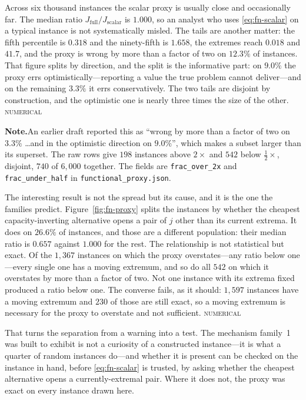 \documentclass[conference]{IEEEtran}
\theoremstyle{definition}
\newcommand{\NUM}{\textsc{numerical}}
\newif\ifshownotes\shownotestrue
\newcommand{\NOTEPAR}[1]{\ifshownotes\par\vspace{2pt}\noindent%
  {\color{notecol}\textsf{\footnotesize\textbf{Note.}\;#1}}\par\vspace{2pt}\fi}
\begin{document}
Across six thousand instances the scalar proxy is usually close and occasionally far. The
median ratio $J_{\mathrm{full}}/J_{\mathrm{scalar}}$ is $1.000$, so an analyst who uses
\eqref{eq:fn-scalar} on a typical instance is not systematically misled. The tails are another
matter: the fifth percentile is $0.318$ and the ninety-fifth is $1.658$, the extremes reach
$0.018$ and $41.7$, and the proxy is wrong by more than a factor of two on $12.3\%$ of
instances. That figure splits by direction, and the split is the informative part: on
$9.0\%$ the proxy errs optimistically---reporting a value the true problem cannot
deliver---and on the remaining $3.3\%$ it errs conservatively. The two tails are disjoint by
construction, and the optimistic one is nearly three times the size of the other. \NUM{}
\NOTEPAR{An earlier draft reported this as ``wrong by more than a factor of two on
$3.3\%$ \dots and in the optimistic direction on $9.0\%$'', which makes a subset larger than
its superset. The raw rows give $198$ instances above $2\times$ and $542$ below $\tfrac12
\times$, disjoint, $740$ of $6{,}000$ together. The fields are \texttt{frac\_over\_2x} and
\texttt{frac\_under\_half} in \texttt{functional\_proxy.json}.}

The interesting result is not the spread but its cause, and it is the one the families
predict. Figure~\ref{fig:fn-proxy} splits the instances by whether the cheapest
capacity-inverting alternative opens a pair of $j$ other than its current extrema. It does on
$26.6\%$ of instances, and those are a different population: their median ratio is $0.657$
against $1.000$ for the rest. The relationship is not statistical but exact. Of the $1{,}367$
instances on which the proxy overstates---any ratio below one---every single one has a moving
extremum, and so do all $542$ on which it overstates by more than a factor of two. Not one
instance with its extrema fixed produced a ratio below one. The converse fails, as it should:
$1{,}597$ instances have a moving extremum and $230$ of those are still exact, so a moving
extremum is necessary for the proxy to overstate and not sufficient. \NUM{}

That turns the separation from a warning into a test. The mechanism family~1 was built to
exhibit is not a curiosity of a constructed instance---it is what a quarter of random
instances do---and whether it is present can be checked on the instance in hand, before
\eqref{eq:fn-scalar} is trusted, by asking whether the cheapest alternative opens a
currently-extremal pair. Where it does not, the proxy was exact on every instance drawn here.
\end{document}
